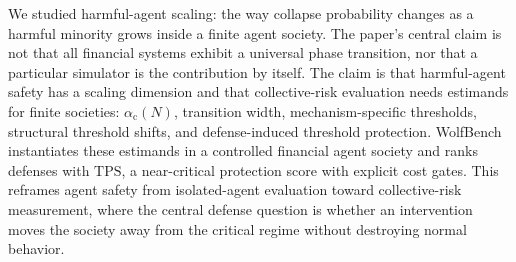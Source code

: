 \documentclass[letterpaper]{article} %
\newcommand{\alphac}{\alpha_{\mathrm{c}}}
\newcommand{\tps}{\mathrm{TPS}}
\begin{document}
We studied harmful-agent scaling: the way collapse probability changes as a
harmful minority grows inside a finite agent society. The paper's central claim
is not that all financial systems exhibit a universal phase transition, nor
that a particular simulator is the contribution by itself. The claim is that
harmful-agent safety has a scaling dimension and that collective-risk
evaluation needs estimands for finite societies: \(\alphac(N)\), transition
width, mechanism-specific thresholds, structural threshold shifts, and
defense-induced threshold protection. WolfBench instantiates these estimands
in a controlled financial agent society and ranks defenses with \(\tps\), a
near-critical protection score with explicit cost gates. This reframes agent
safety from isolated-agent evaluation toward collective-risk measurement, where
the central defense question is whether an intervention moves the society away
from the critical regime without destroying normal behavior.


\end{document}
